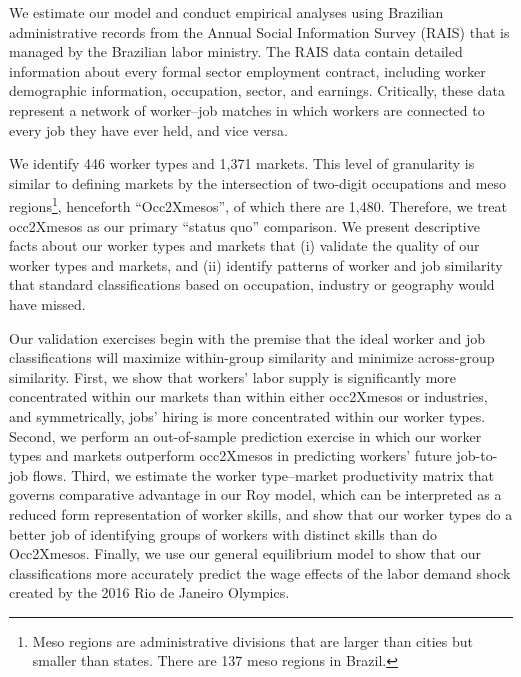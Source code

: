 \documentclass[12pt]{article}
\theoremstyle{definition}
\theoremstyle{plain}
\begin{document}
We estimate our model and conduct empirical analyses using Brazilian administrative records from the Annual Social Information Survey (RAIS) that is managed by the Brazilian labor ministry. The RAIS data contain detailed information about every formal sector employment contract, including worker demographic information, occupation, sector, and earnings. Critically, these data represent a network of worker--job matches in which workers are connected to every job they have ever held, and vice versa.




We identify 446 worker types and 1,371 markets. This level of granularity is similar to defining markets by the intersection of two-digit occupations and meso regions\footnote{Meso regions are administrative divisions that are larger than cities but smaller than states. There are 137 meso regions in Brazil.}, henceforth ``Occ2Xmesos'', of which there are 1,480. Therefore, we treat occ2Xmesos as our primary ``status quo'' comparison. We present descriptive facts about our worker types and markets that (i) validate the quality of our worker types and markets, and (ii) identify patterns of worker and job similarity that standard classifications based on occupation, industry or geography would have missed.


Our validation exercises begin with the premise that the ideal worker and job classifications will maximize within-group similarity and minimize across-group similarity. First, we show that workers' labor supply is significantly more concentrated within our markets than within either occ2Xmesos or industries, and symmetrically, jobs' hiring is more concentrated within our worker types. Second, we perform an out-of-sample prediction exercise in which our worker types and markets outperform occ2Xmesos in predicting workers' future job-to-job flows. Third, we estimate the worker type--market productivity matrix that governs comparative advantage in our Roy model, which can be interpreted as a reduced form representation of worker skills, and show that our worker types do a better job of identifying groups of workers with distinct skills than do Occ2Xmesos. Finally, we use our general equilibrium model to show that our classifications more accurately predict the wage effects of the labor demand shock created by the 2016 Rio de Janeiro Olympics. 
\end{document}
